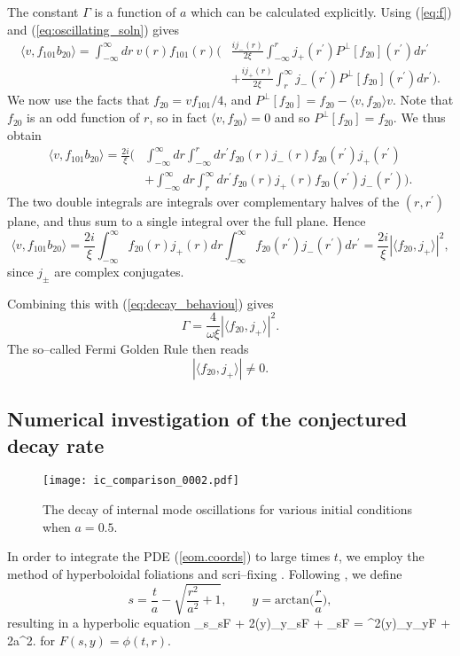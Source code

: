 The constant $\Gamma$ is a function of $a$ which can be calculated explicitly. Using (\ref{eq:f}) and (\ref{eq:oscillating_soln}) gives
\begin{align*}
\langle v, f_{101}b_{20}\rangle = \int_{-\infty}^{\infty}dr\ v(r)f_{101}(r)\bigg(&\frac{ij_-(r)}{2\xi}\int_{-\infty}^r j_+(r^\prime)P^\perp[f_{20}](r^\prime)dr^\prime \\
&+ \frac{ij_+(r)}{2\xi}\int_r^{\infty} j_-(r^\prime)P^\perp[f_{20}](r^\prime) dr^\prime\bigg).
\end{align*}
We now use the facts that $f_{20}=vf_{101}/4$, and $P^\perp[f_{20}]=f_{20}-\langle v,f_{20}\rangle v$. Note that $f_{20}$ is an odd function of $r$, so in fact $\langle v,f_{20}\rangle=0$ and so $P^\perp[f_{20}]=f_{20}$. We thus obtain
\begin{align*}
\langle v, f_{101}b_{20}\rangle = \frac{2i}{\xi}\bigg(&\int_{-\infty}^{\infty}dr
\int_{-\infty}^r dr^\prime f_{20}(r)j_-(r)f_{20}(r^\prime)j_+(r^\prime) \\
&+ \int_{-\infty}^{\infty}dr\int_r^{\infty}dr^\prime f_{20}(r)j_+(r)f_{20}(r^\prime)j_-(r^\prime)\bigg).
\end{align*}
The two double integrals are integrals over complementary halves of the $(r,r^\prime)$ plane, and thus sum to a single integral over the full plane. Hence
\[
\langle v, f_{101}b_{20}\rangle = \frac{2i}{\xi}\int_{-\infty}^{\infty}f_{20}(r)j_+(r)dr
\int_{-\infty}^\infty  f_{20}(r^\prime)j_-(r^\prime) dr^\prime=\frac{2i}{\xi}|\langle f_{20}, j_+ \rangle|^2,
\]
since $j_\pm$ are complex conjugates.

Combining this with (\ref{eq:decay_behaviou}) gives
\[
\Gamma = \frac{4}{\omega\xi}|\langle f_{20}, j_+\rangle|^2.
\]
The so--called Fermi Golden Rule then reads
\[
|\langle f_{20}, j_+\rangle|\neq 0.
\]

\subsection{Numerical investigation of the conjectured decay rate}
\label{sec:numerics}

\begin{figure}
\texttt{[image: ic\_comparison\_0002.pdf]}
\caption{\label{fig:decay} The decay of internal mode oscillations for various initial conditions when $a=0.5$.}
\end{figure}

In order to integrate the PDE (\ref{eom.coords}) to large times $t$, we employ the method of hyperboloidal foliations and scri--fixing \cite{hyp_foliations}. Following \cite{wavemaps, SG}, we define
\[
s = \frac{t}{a} - \sqrt{\frac{r^2}{a^2}+1}, \qquad y=\mathrm{arctan}\Big(\frac{r}{a}\Big),
\]
resulting in a hyperbolic equation
\be
\label{eq:s_and_y}
\p_s\p_sF + 2(y)\p_y\p_sF + \p_sF = ^2(y)\p_y\p_yF + 2a^2.
\ee
for $F(s,y)=\phi(t,r)$. %

